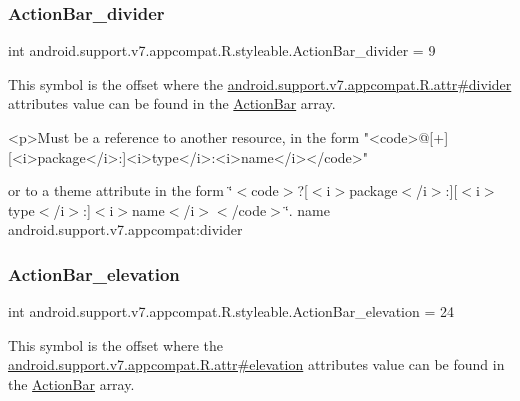 \subsubsection{\texorpdfstring{Action\+Bar\+\_\+divider}{ActionBar\_divider}}
{\footnotesize\ttfamily int android.\+support.\+v7.\+appcompat.\+R.\+styleable.\+Action\+Bar\+\_\+divider = 9\hspace{0.3cm}{\ttfamily [static]}}

This symbol is the offset where the \hyperlink{classandroid_1_1support_1_1v7_1_1appcompat_1_1R_1_1attr_a8f75111bd93530bdbf366ffa149e524f}{android.\+support.\+v7.\+appcompat.\+R.\+attr\#divider} attribute\textquotesingle{}s value can be found in the \hyperlink{classandroid_1_1support_1_1v7_1_1appcompat_1_1R_1_1styleable_a5941dc15714398e9ec9afaa0155cc1cf}{Action\+Bar} array.

\begin{DoxyVerb}      <p>Must be a reference to another resource, in the form "<code>@[+][<i>package</i>:]<i>type</i>:<i>name</i></code>"
\end{DoxyVerb}
 or to a theme attribute in the form \char`\"{}$<$code$>$?\mbox{[}$<$i$>$package$<$/i$>$\+:\mbox{]}\mbox{[}$<$i$>$type$<$/i$>$\+:\mbox{]}$<$i$>$name$<$/i$>$$<$/code$>$\char`\"{}.  name android.\+support.\+v7.\+appcompat\+:divider \mbox{\label{classandroid_1_1support_1_1v7_1_1appcompat_1_1R_1_1styleable_ae579e5417de8c952045d216fc0ced26f}} 
\subsubsection{\texorpdfstring{Action\+Bar\+\_\+elevation}{ActionBar\_elevation}}
{\footnotesize\ttfamily int android.\+support.\+v7.\+appcompat.\+R.\+styleable.\+Action\+Bar\+\_\+elevation = 24\hspace{0.3cm}{\ttfamily [static]}}

This symbol is the offset where the \hyperlink{classandroid_1_1support_1_1v7_1_1appcompat_1_1R_1_1attr_a4ad8a7d23ae4731f5836683e9cb7f790}{android.\+support.\+v7.\+appcompat.\+R.\+attr\#elevation} attribute\textquotesingle{}s value can be found in the \hyperlink{classandroid_1_1support_1_1v7_1_1appcompat_1_1R_1_1styleable_a5941dc15714398e9ec9afaa0155cc1cf}{Action\+Bar} array.

